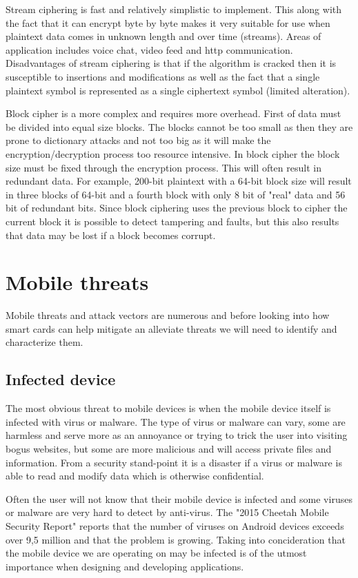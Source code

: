 Stream ciphering is fast and relatively simplistic to implement. This along with the fact that it can encrypt byte by byte makes it very suitable for use when plaintext data comes in  unknown length and over time (streams). Areas of application includes voice chat, video feed and http communication. Disadvantages of stream ciphering is that if the algorithm is cracked then it is susceptible to insertions and modifications as well as the fact that a single plaintext symbol is represented as a single ciphertext symbol (limited alteration).

Block cipher is a more complex and requires more overhead. First of data must be divided into equal size blocks. The blocks cannot be too small as then they are prone to dictionary attacks and not too big as it will make the encryption/decryption process too resource intensive. In block cipher the block size must be fixed through the encryption process. This will often result in redundant data. For example, 200-bit plaintext with a 64-bit block size will result in three blocks of 64-bit and a fourth block with only 8 bit of "real" data and 56 bit of redundant bits. Since block ciphering uses the previous block to cipher the current block it is possible to detect tampering and faults, but this also results that data may be lost if a block becomes corrupt.


\section{Mobile threats}
Mobile threats and attack vectors are numerous and before looking into how smart cards can help mitigate an alleviate threats we will need to identify and characterize them.
\subsection{Infected device}
The most obvious threat to mobile devices is when the mobile device itself is infected with virus or malware. The type of virus or malware can vary, some are harmless and serve more as an annoyance or trying to trick the user into visiting bogus websites, but some are more malicious and will access private files and information. From a security stand-point it is a disaster if a virus or malware is able to read and modify data which is otherwise confidential.

Often the user will not know that their mobile device is infected and some viruses or malware are very hard to detect by anti-virus. The "2015 Cheetah Mobile Security Report" \cite{cheetahSec} reports that the number of viruses on Android devices exceeds over 9,5 million and that the problem is growing. Taking into concideration that the mobile device we are operating on may be infected is of the utmost importance when designing and developing applications.

